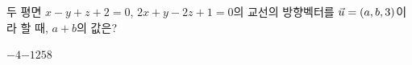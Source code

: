 두 평면 $x-y+z+2=0$, $2x+y-2z+1=0$의 교선의 방향벡터를 $\vec{u}=(a{,}\mkern3mu\mathopen{}b{,}\mkern3mu\mathopen{}3)$이라 할 때, $a+b$의 값은?
\begin{choices32}{$-4$}{$-1$}{$2$}{$5$}{$8$}\end{choices32}
